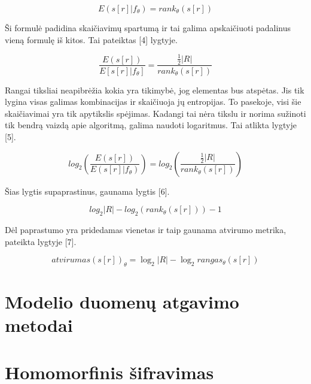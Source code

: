 \documentclass{VUMIFInfBakalaurinis}
\begin{document}
\begin{equation}
E(s[r]|f_{\theta}) = rank_{\theta}(s[r])
\end{equation} 

\par Ši formulė padidina skaičiavimų spartumą ir tai galima apskaičiuoti padalinus vieną formulę iš kitos. Tai pateiktas [4] lygtyje.

\begin{equation}
\frac{E(s[r])}{E[s[r]|f_{\theta}]} = \frac{\frac{1}{2}|R|}{rank_{\theta}(s[r])}
\end{equation}

\par Rangai tiksliai neapibrėžia kokia yra tikimybė, jog elementas bus atspėtas. Jis tik lygina visas galimas kombinacijas ir skaičiuoja jų entropijas. To pasekoje, visi šie skaičiavimai yra tik apytikslis spėjimas. Kadangi tai nėra tikslu ir norima sužinoti tik bendrą vaizdą apie algoritmą, galima naudoti logaritmus. Tai atlikta lygtyje [5].

\begin{equation}
log_{2}(\frac{E(s[r])}{E(s[r]|f_{\theta})}) = log_{2}(\frac{\frac{1}{2}|R|}{rank_{\theta}(s[r])})
\end{equation}

\par Šias lygtis supaprastinus, gaunama lygtis [6].

\begin{equation}
log_{2}|R| - log_{2}(rank_{\theta}(s[r])) - 1
\end{equation}

\par Dėl paprastumo yra pridedamas vienetas ir taip gaunama atvirumo metrika, pateikta lygtyje [7].

\begin{equation}
atvirumas(s[r])_{\theta} = \log_2 | R | - \log_2 rangas_{\theta}(s[r])

\end{equation}




\section{Modelio duomenų atgavimo metodai}

\section{Homomorfinis šifravimas}
\end{document}
